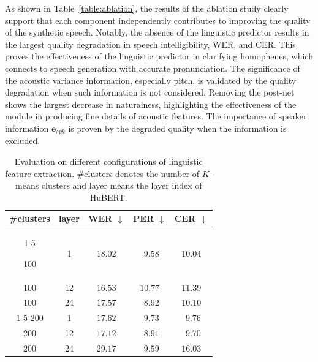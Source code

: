 \documentclass[letterpaper]{article} %
\begin{document}
As shown in Table~\ref{table:ablation}, the results of the ablation study clearly support that each component independently contributes to improving the quality of the synthetic speech.
Notably, the absence of the linguistic predictor results in the largest quality degradation in speech intelligibility, WER, and CER. This proves the effectiveness of the linguistic predictor in clarifying homophenes, which connects to speech generation with accurate pronunciation.
The significance of the acoustic variance information, especially pitch, is validated by the quality degradation when such information is not considered.
Removing the post-net shows the largest decrease in naturalness, highlighting the effectiveness of the module in producing fine details of acoustic features.
The importance of speaker information $\boldsymbol{e}_{spk}$ is proven by the degraded quality when the information is excluded.

\begin{table}
\centering
{
\begin{tabular}{ccccc}
\toprule
\#clusters 
      &layer   &WER $\downarrow$  &PER $\downarrow$ &CER $\downarrow$    \\  \cmidrule(lr){1-5}

    100  &1       &$18.02$ &$~~9.58$  &$10.04$     \\ 
    100  &12 &$\mathbf{16.53}$ & $10.77$ & $11.39$ \\
    100  &24 &$17.57$ &$~~8.92$ &$10.10$ \\ \cmidrule(lr){1-5}
    200  &1  &$17.62$ &$~~9.73$ &$~~9.76$ \\
    200  &12 &$17.12$ &$~~\mathbf{8.91}$ &$~~\mathbf{9.70}$ \\  
    200  &24 &$29.17$ &$~~9.59$ &$16.03$  \\
\bottomrule
\end{tabular}
}
\vspace{-1mm}
\caption{Evaluation on different configurations of linguistic feature extraction. \#clusters denotes the number of $K$-means clusters and layer means the layer index of HuBERT.}
\label{table:SSL}
\end{table}
\end{document}
